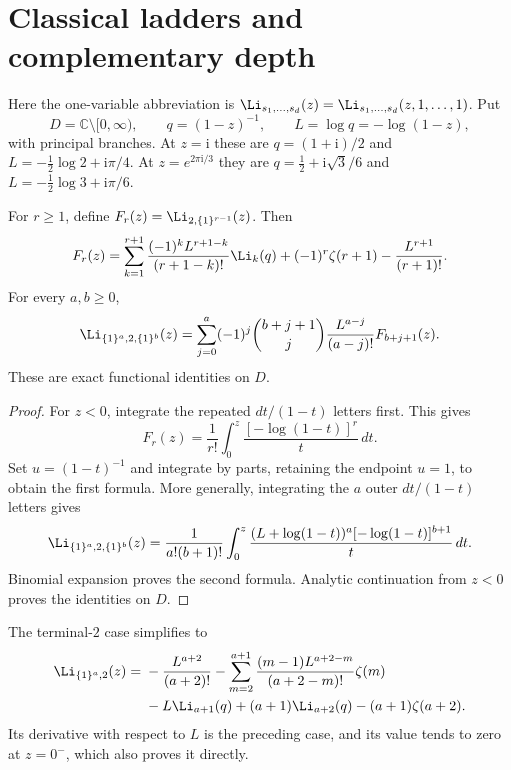 
\section{Classical ladders and complementary depth}
\label{cd:sec:ladders}
Here the one-variable abbreviation is
$\Li_{s_1,\ldots,s_d}(z)=\Li_{s_1,\ldots,s_d}(z,1,\ldots,1)$.
Put
\[
 D=\mathbb C\setminus[0,\infty),\qquad
 q=(1-z)^{-1},\qquad L=\log q=-\log(1-z),
\]
with principal branches. At $z=\mathrm i$ these are
$q=(1+\mathrm i)/2$ and $L=-\tfrac12\log2+\mathrm i\pi/4$.
At $z=e^{2\pi\mathrm i/3}$ they are
$q=\tfrac12+\mathrm i\sqrt3/6$ and
$L=-\tfrac12\log3+\mathrm i\pi/6$.

\begin{theorem}\label{cd:thm:onezero}
For $r\ge1$, define $F_r(z)=\Li_{2,\{1\}^{r-1}}(z)$. Then
\[
 F_r(z)=\sum_{k=1}^{r+1}
 \frac{(-1)^kL^{r+1-k}}{(r+1-k)!}\Li_k(q)
 +(-1)^r\zeta(r+1)-\frac{L^{r+1}}{(r+1)!}.
\]
For every $a,b\ge0$,
\[
 \Li_{\{1\}^a,2,\{1\}^b}(z)
 =\sum_{j=0}^{a}(-1)^j\binom{b+j+1}{j}
 \frac{L^{a-j}}{(a-j)!}F_{b+j+1}(z).
\]
These are exact functional identities on $D$.
\end{theorem}
\begin{proof}
For $z<0$, integrate the repeated $dt/(1-t)$ letters first. This gives
\[
 F_r(z)=\frac1{r!}\int_0^z\frac{[-\log(1-t)]^r}{t}\,dt.
\]
Set $u=(1-t)^{-1}$ and integrate by parts, retaining the endpoint
$u=1$, to obtain the first formula. More generally, integrating the
$a$ outer $dt/(1-t)$ letters gives
\[
 \Li_{\{1\}^a,2,\{1\}^b}(z)=\frac1{a!(b+1)!}
 \int_0^z\frac{(L+\log(1-t))^a[-\log(1-t)]^{b+1}}{t}\,dt.
\]
Binomial expansion proves the second formula. Analytic continuation
from $z<0$ proves the identities on $D$.
\end{proof}

The terminal-$2$ case simplifies to
\begin{align}
 \Li_{\{1\}^a,2}(z)
 ={}&-\frac{L^{a+2}}{(a+2)!}
 -\sum_{m=2}^{a+1}\frac{(m-1)L^{a+2-m}}{(a+2-m)!}\zeta(m)
 \notag\\
 &-L\Li_{a+1}(q)+(a+1)\Li_{a+2}(q)-(a+1)\zeta(a+2).
 \label{cd:eq:terminal}
\end{align}
Its derivative with respect to $L$ is the preceding case, and its
value tends to zero at $z=0^-$, which also proves it directly.

